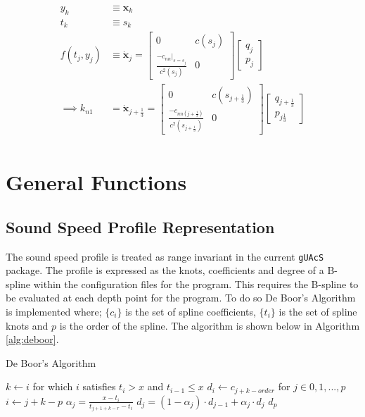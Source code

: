 \documentclass{article}
\begin{document}
\begin{align*}
  y_{k}&\equiv\bm{x}_k\\ 
  t_k&\equiv s_k \\
  f(t_j, y_j)&\equiv\dot{\bm{x}}_j=\begin{bmatrix} 0 & c(s_j) \\ \frac{-c_{nn}|_{s=s_j}}{c^2(s_j)} & 0\end{bmatrix}\begin{bmatrix} q_j \\ p_j\end{bmatrix}\\
  \implies k_{n1} &= \dot{\bm{x}}_{j + \frac{1}{3}} = \begin{bmatrix} 0 & c(s_{j + \frac{1}{3}}) \\ \frac{-c_{nn(j+\frac{1}{3})}}{c^2(s_{j+\frac{1}{3}})} & 0\end{bmatrix}\begin{bmatrix} q_{j+\frac{1}{3}} \\ p_{j\frac{1}{3}} \end{bmatrix}\\ 
\end{align*}
\section{General Functions}
\subsection{Sound Speed Profile Representation}
The sound speed profile is treated as range invariant in the current \texttt{gUAcS} package. The profile is expressed as the knots, coefficients and degree of a B-spline within the configuration files for the program. This requires the B-spline to be evaluated at each depth point for the program. To do so De Boor's Algorithm is implemented where; $\{c_{i}\}$ is the set of spline coefficients, $\{t_{i}\}$ is the set of spline knots and $p$ is the order of the spline. The algorithm is shown below in Algorithm \ref{alg:deboor}.
\begin{algorithm}[H]
  \caption{De Boor's Algorithm}
  \label{alg:deboor}
  \begin{algorithmic}
    \State $k\gets i$ for which $i$ satisfies $t_{i} > x$ and $t_{i-1} \leq x$
    \State $d_i\gets c_{j + k -order}$ for $j\in{0,1,...,p}$
        \State $i\gets j + k - p$
        \State $\alpha_j = \frac{x - t_i}{t_{j + 1 + k - r} - t_{i}}$
        \State $d_j = (1 - \alpha_j)\cdot d_{j-1} + \alpha_j\cdot d_{j}$
      \EndFor
    \EndFor
    \Return $d_{p}$
  \end{algorithmic}
\end{algorithm}


\nocite{*}
\printbibliography
\end{document}
